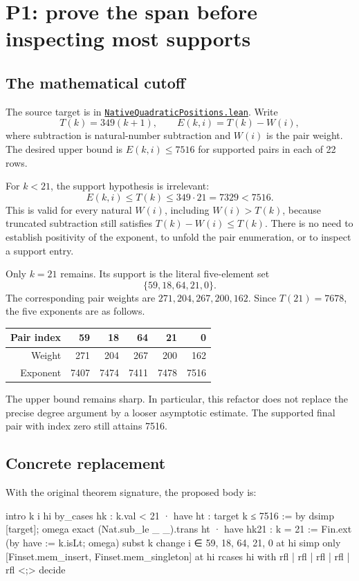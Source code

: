 \documentclass[11pt,letterpaper]{article}
\newcommand{\code}[1]{\texttt{\detokenize{#1}}}
\newcommand{\base}{https://github.com/VladimirReshetnikov/ProveIt/blob/553a5f7a463cbaab8800ff8148fef0bc5a9e1b22/Computability/DiophantineConsistency/Lean/DiophantineConsistency/}
\newcommand{\source}[1]{\href{\base#1.lean}{\nolinkurl{#1.lean}}}
\begin{document}
\section{P1: prove the span before inspecting most supports}
\label{sec:span}

\subsection{The mathematical cutoff}

The source target is \code{index_span} in \source{NativeQuadraticPositions}. Write
\[
 T(k)=349(k+1),\qquad E(k,i)=T(k)-W(i),
\]
where subtraction is natural-number subtraction and $W(i)$ is the pair weight. The desired upper bound is $E(k,i)\le 7516$ for supported pairs in each of 22 rows.

For $k<21$, the support hypothesis is irrelevant:
\[
 E(k,i)\le T(k)\le349\cdot21=7329<7516.
\]
This is valid for every natural $W(i)$, including $W(i)>T(k)$, because truncated subtraction still satisfies $T(k)-W(i)\le T(k)$. There is no need to establish positivity of the exponent, to unfold the pair enumeration, or to inspect a support entry.

Only $k=21$ remains. Its support is the literal five-element set
\[
 \{59,18,64,21,0\}.
\]
The corresponding pair weights are $271,204,267,200,162$. Since $T(21)=7678$, the five exponents are as follows.

\begin{center}
\begin{tabular}{rrrrrr}
\toprule
Pair index & 59 & 18 & 64 & 21 & 0\\
\midrule
Weight & 271 & 204 & 267 & 200 & 162\\
Exponent & 7407 & 7474 & 7411 & 7478 & 7516\\
\bottomrule
\end{tabular}
\end{center}

The upper bound remains sharp. In particular, this refactor does not replace the precise degree argument by a looser asymptotic estimate. The supported final pair with index zero still attains 7516.

\subsection{Concrete replacement}

With the original theorem signature, the proposed body is:

\begin{Lean}
  intro k i hi
  by_cases hk : k.val < 21
  · have ht : target k ≤ 7516 := by dsimp [target]; omega
    exact (Nat.sub_le _ _).trans ht
  · have hk21 : k = 21 := Fin.ext (by have := k.isLt; omega)
    subst k
    change i ∈ {59, 18, 64, 21, 0} at hi
    simp only [Finset.mem_insert, Finset.mem_singleton] at hi
    rcases hi with rfl | rfl | rfl | rfl | rfl <;> decide
\end{Lean}
\end{document}
